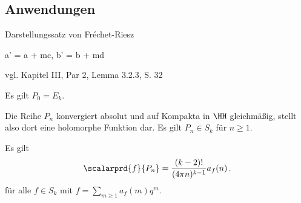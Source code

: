 \subsection{Anwendungen}

Darstellungssatz von Fréchet-Riesz

a' = a + mc, b' = b + md

vgl. Kapitel III, Par 2, Lemma 3.2.3, S. 32


\begin{beme}
Es gilt $P_0 = E_k$.
\end{beme}

\begin{satz-list}
\item Die Reihe $P_n$ konvergiert absolut und auf Kompakta in $\HH$ gleichmäßig, stellt also dort eine holomorphe Funktion dar. Es gilt $P_n \in S_k$ für $n \geq 1$.
\item Es gilt 
\[
	\scalarprd {f}{P_n} = \frac{(k-2)!}{(4\pi n)^{k-1}} a_f(n)
	\,.
\]
für alle $f \in S_k$ mit $f = \sum_{m\geq 1} a_f(m) q^m$.
\end{satz-list}

